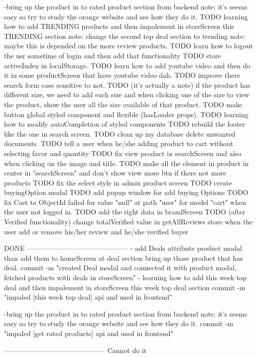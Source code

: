 
-bring up the product in to rated product section from backend 
      note: it's seems easy so try to study the orange website and see how they do it.
TODO   learning how to add TRENDING products and then impalement in storeScreen this TRENDING section
      note: change the second top deal section to trending 
      note: maybe this is depended on the more review products.
TODO   learn how to logout the usr sometime of login and then add that functionality
TODO   store activeIndex in localStorage.
TODO   learn how to add youtube video and then do it in some productScreen that have youtube video dah.
TODO   improve there search form case sensitive to not.
TODO   (it's actually a note) if the product has different size, we need to add each size and when
          clicking one of the size to view the product, show the user all the size available of that product.
TODO   make button global styled component and flexible (hasLoader props).
TODO   learning how to modify autoCompletion of styled components 
TODO   rebuild the footer like the one in search screen.
TODO   clean up my database delete unwanted documents.
TODO   tell a user when he/she adding product to cart without selecting favor and quantity
TODO   fix view product in searchScreen and also when clicking on the image and title.
TODO   make all the element in product in center in "searchScreen" and don't show view more btn if there not more products
TODO   fix the select style in admin product screen
TODO   create buyingOption modal 
TODO   add popup window for add buying Options
TODO   fix Cast to ObjectId failed for value "null" at path "user" for model "cart" when the user not logged in.
TODO   add the right data in brandScreen 
TODO   (after Verified functionality) change totalVerified value in getAllReviews store when the user add or remove his/her review and he/she verified buyer

DONE
--------------------------------------------
- add Deals attribute product modal than add them to homeScreen 
       at deal section bring up those product that has deal.
       commit -m "created Deal modal and connected it with product modal, fetched products with deals in 
       storeScreen"
- learning how to add this week top deal and then impalement in storeScreen this week top deal section
      commit -m "impaled [this week top deal] api and used in frontend"

-bring up the product in to rated product section from backend 
      note: it's seems easy so try to study the orange website and see how they do it.
      commit -m "impaled [get rated products] api and used in frontend"

--------------------------------------------
Cannot do it
